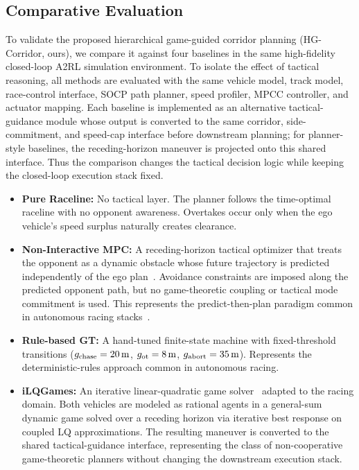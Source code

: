 
\subsection{Comparative Evaluation}
\label{subsec:comparison}

To validate the proposed hierarchical game-guided corridor planning
(HG-Corridor, ours), we compare it against four baselines in the same
high-fidelity closed-loop A2RL simulation environment.  To isolate the effect
of tactical reasoning, all methods are evaluated with the same vehicle model,
track model, race-control interface, SOCP path planner, speed profiler, MPCC
controller, and actuator mapping.  Each baseline is implemented as an
alternative tactical-guidance module whose output is converted to the same
corridor, side-commitment, and speed-cap interface before downstream planning;
for planner-style baselines, the receding-horizon maneuver is projected onto
this shared interface.  Thus the comparison changes the tactical decision
logic while keeping the closed-loop execution stack fixed.

\begin{itemize}
\item \textbf{Pure Raceline:} No tactical layer.  The planner follows the
  time-optimal raceline with no opponent awareness.  Overtakes occur only
  when the ego vehicle's speed surplus naturally creates clearance.
\item \textbf{Non-Interactive MPC:} A receding-horizon tactical optimizer
  that treats the opponent as a dynamic obstacle whose future trajectory is
  predicted independently of the ego plan~\cite{betz2022software}.  Avoidance
  constraints are imposed along the predicted opponent path, but no
  game-theoretic coupling or tactical mode commitment is used.  This
  represents the predict-then-plan paradigm common in autonomous racing
  stacks~\cite{kabzan2020amzracing,betz2023autonomous}.
\item \textbf{Rule-based GT:} A hand-tuned finite-state machine
  with fixed-threshold transitions ($g_{\rm chase}=20\,\mathrm{m}$,
  $g_{\rm ot}=8\,\mathrm{m}$, $g_{\rm abort}=35\,\mathrm{m}$).
  Represents the deterministic-rules approach common in autonomous racing.
\item \textbf{iLQGames:} An iterative linear-quadratic game
  solver~\cite{fridovich2020ilqgames} adapted to the racing domain.  Both
  vehicles are modeled as rational agents in a general-sum dynamic game
  solved over a receding horizon via iterative best response on
  coupled LQ approximations.  The resulting maneuver is converted to the
  shared tactical-guidance interface, representing the class of
  non-cooperative game-theoretic planners without changing the downstream
  execution stack.
\end{itemize}

